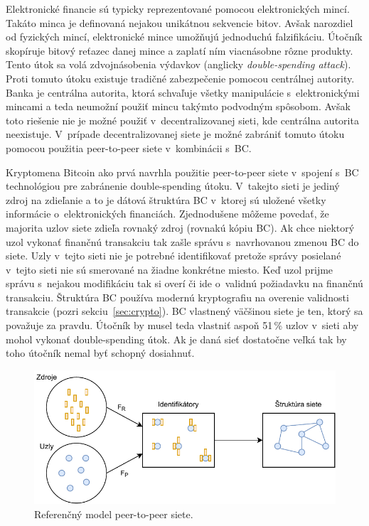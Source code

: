 Elektronické financie sú typicky reprezentované pomocou elektronických mincí. Takáto minca je definovaná nejakou unikátnou sekvencie bitov. Avšak narozdiel od fyzických mincí, elektronické mince umožňujú jednoduchú falzifikáciu. Útočník skopíruje bitový reťazec danej mince a zaplatí ním viacnásobne rôzne produkty. Tento útok sa volá zdvojnásobenia výdavkov (anglicky \textit{double-spending attack}). Proti tomuto útoku existuje tradičné zabezpečenie pomocou centrálnej autority. Banka je centrálna autorita, ktorá schvaľuje všetky manipulácie s~elektronickými mincami a teda neumožní použiť mincu takýmto podvodným spôsobom. Avšak toto riešenie nie je možné použiť v~decentralizovanej sieti, kde centrálna autorita neexistuje. V~prípade decentralizovanej siete je možné zabrániť tomuto útoku pomocou použitia peer-to-peer siete v~kombinácii s~BC.~\cite{doubleSpending}

Kryptomena Bitcoin ako prvá navrhla použitie peer-to-peer siete v~spojení s~BC technológiou pre zabránenie double-spending útoku. V~takejto sieti je jediný zdroj na zdieľanie a to je dátová štruktúra BC v~ktorej sú uložené všetky informácie o~elektronických financiách. Zjednodušene môžeme povedať, že majorita uzlov siete zdieľa rovnaký zdroj (rovnakú kópiu BC). Ak chce niektorý uzol vykonať finančnú transakciu tak zašle správu s~navrhovanou zmenou BC do siete. Uzly v~tejto sieti nie je potrebné identifikovať pretože správy posielané v~tejto sieti nie sú smerované na žiadne konkrétne miesto. Keď uzol prijme správu s~nejakou modifikáciu tak si overí či ide o~validnú požiadavku na finančnú transakciu. Štruktúra BC používa modernú kryptografiu na overenie validnosti transakcie (pozri sekciu~\ref{sec:crypto}). BC vlastnený väčšinou siete je ten, ktorý sa považuje za pravdu. Útočník by musel teda vlastniť aspoň 51\,\% uzlov v~sieti aby mohol vykonať double-spending útok. Ak je daná sieť dostatočne veľká tak by toho útočník nemal byť schopný dosiahnuť.~\cite{satoshiBitcoin}

\begin{figure}[bt]
	\centering
	\includegraphics[width=\textwidth]{obrazky-figures/p2p-ref-model.pdf}
	\caption{Referenčný model peer-to-peer siete.~\cite{p2pEssence}}
	\label{img:p2p-ref-model}
\end{figure}

